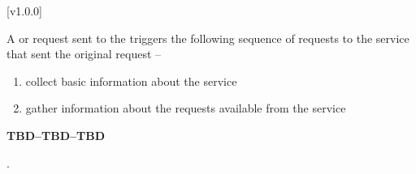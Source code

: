 [v1.0.0]
%

A  or
 request sent to the
 triggers the following sequence of
requests to the service that sent the original request --
\begin{enumerate}
\item \textbf{} collect basic information about the
service
\item \textbf{} gather information about the requests
available from the service
\end{enumerate}

			\begin{Large}\textbf{TBD--TBD--TBD}\end{Large}.

\appendixEnd{}
